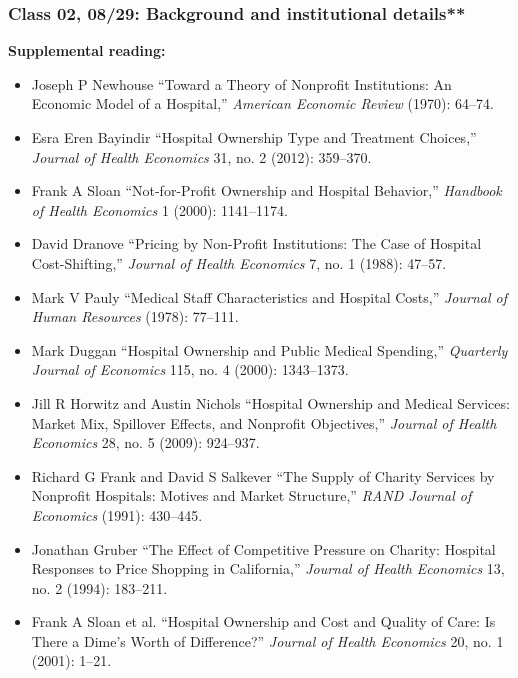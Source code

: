 \documentclass[11pt,]{article}
\providecommand{\tightlist}{%
  \setlength{\itemsep}{0pt}\setlength{\parskip}{0pt}}
\begin{document}
\hypertarget{class-02-0829-background-and-institutional-details}{%
\subsubsection{Class 02, 08/29: Background and institutional
details**}\label{class-02-0829-background-and-institutional-details}}

\textbf{Supplemental reading:}

\begin{itemize}
\tightlist
\item
  Joseph P Newhouse {``Toward a Theory of Nonprofit Institutions: {An}
  Economic Model of a Hospital,''} \emph{American Economic Review}
  (1970): 64--74.
\item
  Esra Eren Bayindir {``Hospital Ownership Type and Treatment
  Choices,''} \emph{Journal of Health Economics} 31, no. 2 (2012):
  359--370.
\item
  Frank A Sloan {``Not-for-Profit Ownership and Hospital Behavior,''}
  \emph{Handbook of Health Economics} 1 (2000): 1141--1174.
\item
  David Dranove {``Pricing by Non-Profit Institutions: The Case of
  Hospital Cost-Shifting,''} \emph{Journal of Health Economics} 7, no. 1
  (1988): 47--57.
\item
  Mark V Pauly {``Medical Staff Characteristics and Hospital Costs,''}
  \emph{Journal of Human Resources} (1978): 77--111.
\item
  Mark Duggan {``Hospital {Ownership} and {Public} {Medical}
  {Spending},''} \emph{Quarterly Journal of Economics} 115, no. 4
  (2000): 1343--1373.
\item
  Jill R Horwitz and Austin Nichols {``Hospital Ownership and Medical
  Services: Market Mix, Spillover Effects, and Nonprofit Objectives,''}
  \emph{Journal of Health Economics} 28, no. 5 (2009): 924--937.
\item
  Richard G Frank and David S Salkever {``The Supply of Charity Services
  by Nonprofit Hospitals: Motives and Market Structure,''} \emph{RAND
  Journal of Economics} (1991): 430--445.
\item
  Jonathan Gruber {``The Effect of Competitive Pressure on Charity:
  {Hospital} Responses to Price Shopping in {California},''}
  \emph{Journal of Health Economics} 13, no. 2 (1994): 183--211.
\item
  Frank A Sloan et al. {``Hospital Ownership and Cost and Quality of
  Care: Is There a Dime's Worth of Difference?''} \emph{Journal of
  Health Economics} 20, no. 1 (2001): 1--21.

\end{itemize}
\end{document}
